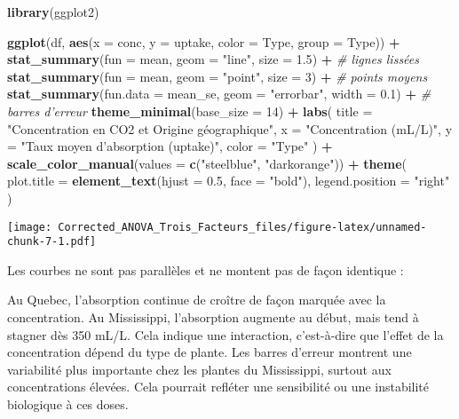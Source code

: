 \documentclass[
]{article}
\newenvironment{Shaded}{\begin{snugshade}}{\end{snugshade}}
\newcommand{\AttributeTok}[1]{\textcolor[rgb]{0.13,0.29,0.53}{#1}}
\newcommand{\CommentTok}[1]{\textcolor[rgb]{0.56,0.35,0.01}{\textit{#1}}}
\newcommand{\DecValTok}[1]{\textcolor[rgb]{0.00,0.00,0.81}{#1}}
\newcommand{\FloatTok}[1]{\textcolor[rgb]{0.00,0.00,0.81}{#1}}
\newcommand{\FunctionTok}[1]{\textcolor[rgb]{0.13,0.29,0.53}{\textbf{#1}}}
\newcommand{\NormalTok}[1]{#1}
\newcommand{\SpecialCharTok}[1]{\textcolor[rgb]{0.81,0.36,0.00}{\textbf{#1}}}
\newcommand{\StringTok}[1]{\textcolor[rgb]{0.31,0.60,0.02}{#1}}
\begin{document}
\begin{Shaded}
\begin{Highlighting}[]
\FunctionTok{library}\NormalTok{(ggplot2)}

\FunctionTok{ggplot}\NormalTok{(df, }\FunctionTok{aes}\NormalTok{(}\AttributeTok{x =}\NormalTok{ conc, }\AttributeTok{y =}\NormalTok{ uptake, }\AttributeTok{color =}\NormalTok{ Type, }\AttributeTok{group =}\NormalTok{ Type)) }\SpecialCharTok{+}
  \FunctionTok{stat\_summary}\NormalTok{(}\AttributeTok{fun =}\NormalTok{ mean, }\AttributeTok{geom =} \StringTok{"line"}\NormalTok{, }\AttributeTok{size =} \FloatTok{1.5}\NormalTok{) }\SpecialCharTok{+}               \CommentTok{\# lignes lissées}
  \FunctionTok{stat\_summary}\NormalTok{(}\AttributeTok{fun =}\NormalTok{ mean, }\AttributeTok{geom =} \StringTok{"point"}\NormalTok{, }\AttributeTok{size =} \DecValTok{3}\NormalTok{) }\SpecialCharTok{+}                \CommentTok{\# points moyens}
  \FunctionTok{stat\_summary}\NormalTok{(}\AttributeTok{fun.data =}\NormalTok{ mean\_se, }\AttributeTok{geom =} \StringTok{"errorbar"}\NormalTok{, }\AttributeTok{width =} \FloatTok{0.1}\NormalTok{) }\SpecialCharTok{+}  \CommentTok{\# barres d’erreur}
  \FunctionTok{theme\_minimal}\NormalTok{(}\AttributeTok{base\_size =} \DecValTok{14}\NormalTok{) }\SpecialCharTok{+}
  \FunctionTok{labs}\NormalTok{(}
    \AttributeTok{title =} \StringTok{"Concentration en CO2 et Origine géographique"}\NormalTok{,}
    \AttributeTok{x =} \StringTok{"Concentration (mL/L)"}\NormalTok{,}
    \AttributeTok{y =} \StringTok{"Taux moyen d’absorption (uptake)"}\NormalTok{,}
    \AttributeTok{color =} \StringTok{"Type"}
\NormalTok{  ) }\SpecialCharTok{+}
  \FunctionTok{scale\_color\_manual}\NormalTok{(}\AttributeTok{values =} \FunctionTok{c}\NormalTok{(}\StringTok{"steelblue"}\NormalTok{, }\StringTok{"darkorange"}\NormalTok{)) }\SpecialCharTok{+}
  \FunctionTok{theme}\NormalTok{(}
    \AttributeTok{plot.title =} \FunctionTok{element\_text}\NormalTok{(}\AttributeTok{hjust =} \FloatTok{0.5}\NormalTok{, }\AttributeTok{face =} \StringTok{"bold"}\NormalTok{),}
    \AttributeTok{legend.position =} \StringTok{"right"}
\NormalTok{  )}
\end{Highlighting}
\end{Shaded}

\texttt{[image: Corrected\_ANOVA\_Trois\_Facteurs\_files/figure-latex/unnamed-chunk-7-1.pdf]}

Les courbes ne sont pas parallèles et ne montent pas de façon identique
:

Au Quebec, l'absorption continue de croître de façon marquée avec la
concentration. Au Mississippi, l'absorption augmente au début, mais tend
à stagner dès 350 mL/L. Cela indique une interaction, c'est-à-dire que
l'effet de la concentration dépend du type de plante. Les barres
d'erreur montrent une variabilité plus importante chez les plantes du
Mississippi, surtout aux concentrations élevées. Cela pourrait refléter
une sensibilité ou une instabilité biologique à ces doses.
\end{document}
